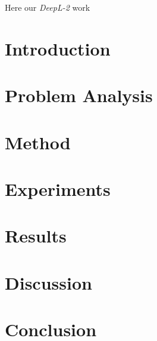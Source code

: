 \documentclass[11pt]{article}
\begin{document}
    \begin{multicols*}{2}

    \noindent Here our \emph{DeepL-2} work

    \section{Introduction} %
    \label{sec:introduction}
    

    \section{Problem Analysis} %
    \label{sec:problem_analysis}
    

    \section{Method} %
    \label{sec:method}
    

    \section{Experiments} %
    \label{sec:experiments}
    

    \section{Results} %
    \label{sec:results}
    

    \section{Discussion} %
    \label{sec:discussion}
    

    \section{Conclusion} %
    \label{sec:conclusion}
    

    \end{multicols*}
\end{document}
